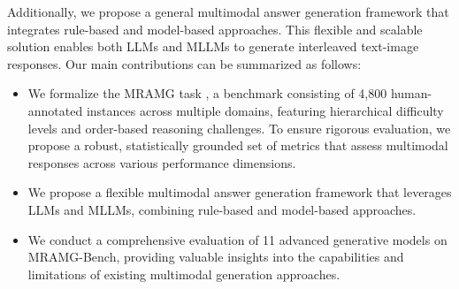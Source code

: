 Additionally, we propose a general multimodal answer generation framework that integrates rule-based and model-based approaches. This flexible and scalable solution enables both LLMs and MLLMs to generate interleaved text-image responses.
Our main contributions can be summarized as follows:
\begin{itemize}
    \item 
    We formalize the MRAMG task 
    , a benchmark consisting of 4,800 human-annotated instances across multiple domains, featuring hierarchical difficulty levels and order-based reasoning challenges. To ensure rigorous evaluation, we propose a robust, statistically grounded set of metrics that assess multimodal responses across various performance dimensions. %
    \item 
    We propose a flexible multimodal answer generation framework that leverages LLMs and MLLMs, combining rule-based and model-based approaches. %
    
    \item 
    We conduct a comprehensive evaluation of 11 advanced generative models on MRAMG-Bench, providing valuable insights into the capabilities and limitations of existing multimodal generation approaches. %
\end{itemize}


